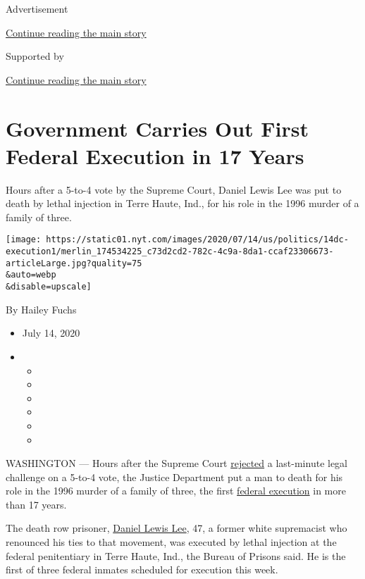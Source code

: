 Advertisement

\protect\hyperlink{after-top}{Continue reading the main story}

Supported by

\protect\hyperlink{after-sponsor}{Continue reading the main story}

\hypertarget{government-carries-out-first-federal-execution-in-17-years}{%
\section{Government Carries Out First Federal Execution in 17
Years}\label{government-carries-out-first-federal-execution-in-17-years}}

Hours after a 5-to-4 vote by the Supreme Court, Daniel Lewis Lee was put
to death by lethal injection in Terre Haute, Ind., for his role in the
1996 murder of a family of three.

\texttt{[image: https://static01.nyt.com/images/2020/07/14/us/politics/14dc-execution1/merlin\_174534225\_c73d2cd2-782c-4c9a-8da1-ccaf23306673-articleLarge.jpg?quality=75\\\&auto=webp\\\&disable=upscale]}

By Hailey Fuchs

\begin{itemize}
\item
  July 14, 2020
\item
  \begin{itemize}
  \item
  \item
  \item
  \item
  \item
  \item
  \end{itemize}
\end{itemize}

WASHINGTON --- Hours after the Supreme Court
\href{https://www.nytimes.com/2020/07/12/us/politics/execution-daniel-lewis-lee.html}{rejected}
a last-minute legal challenge on a 5-to-4 vote, the Justice Department
put a man to death for his role in the 1996 murder of a family of three,
the first
\href{https://www.nytimes.com/2020/07/16/us/politics/wesley-ira-purkey-executed.html}{federal
execution} in more than 17 years.

The death row prisoner,
\href{https://www.nytimes.com/2019/10/29/us/arkansas-federal-death-penalty.html}{Daniel
Lewis Lee}, 47, a former white supremacist who renounced his ties to
that movement, was executed by lethal injection at the federal
penitentiary in Terre Haute, Ind., the Bureau of Prisons said. He is the
first of three federal inmates scheduled for execution this week.

